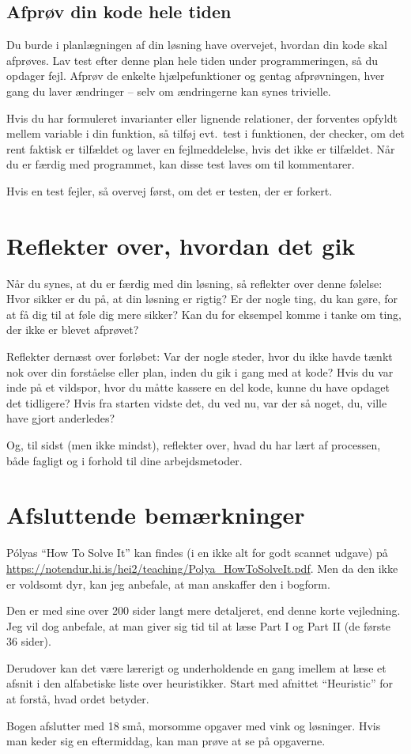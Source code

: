\documentclass[a4paper,12pt]{article}
\begin{document}
\subsection*{Afprøv din kode hele tiden}

Du burde i planlægningen af din løsning have overvejet, hvordan din
kode skal afprøves.  Lav test efter denne plan hele tiden under
programmeringen, så du opdager fejl.  Afprøv de enkelte
hjælpefunktioner og gentag afprøvningen, hver gang du laver ændringer
-- selv om ændringerne kan synes trivielle.

Hvis du har formuleret invarianter eller lignende relationer, der
forventes opfyldt mellem variable i din funktion, så tilføj evt.\ test
i funktionen, der checker, om det rent faktisk er tilfældet og laver
en fejlmeddelelse, hvis det ikke er tilfældet.  Når du er færdig med
programmet, kan disse test laves om til kommentarer.

Hvis en test fejler, så overvej først, om det er testen, der er
forkert.

\section{Reflekter over, hvordan det gik}

Når du synes, at du er færdig med din løsning, så reflekter over denne
følelse: Hvor sikker er du på, at din løsning er rigtig?  Er der nogle
ting, du kan gøre, for at få dig til at føle dig mere sikker?  Kan du
for eksempel komme i tanke om ting, der ikke er blevet afprøvet?

Reflekter dernæst over forløbet: Var der nogle steder, hvor du ikke
havde tænkt nok over din forståelse eller plan, inden du gik i gang
med at kode?  Hvis du var inde på et vildspor, hvor du måtte kassere
en del kode, kunne du have opdaget det tidligere?  Hvis fra starten
vidste det, du ved nu, var der så noget, du, ville have gjort
anderledes?

Og, til sidst (men ikke mindst), reflekter over, hvad du har lært af
processen, både fagligt og i forhold til dine arbejdsmetoder.

\section*{Afsluttende bemærkninger}

Pólyas ``How To Solve It'' kan findes (i en ikke alt for godt scannet
udgave) på
\url{https://notendur.hi.is/hei2/teaching/Polya_HowToSolveIt.pdf}.
Men da den ikke er voldsomt dyr, kan jeg anbefale, at man anskaffer
den i bogform.

Den er med sine over 200 sider langt mere detaljeret, end denne korte
vejledning.  Jeg vil dog anbefale, at man giver sig tid til at læse
Part I og Part II (de første 36 sider).

Derudover kan det være lærerigt og underholdende en gang imellem at
læse et afsnit i den alfabetiske liste over heuristikker.  Start med
afnittet ``Heuristic'' for at forstå, hvad ordet betyder.

Bogen afslutter med 18 små, morsomme opgaver med vink og løsninger.
Hvis man keder sig en eftermiddag, kan man prøve at se på opgaverne.
\end{document}
